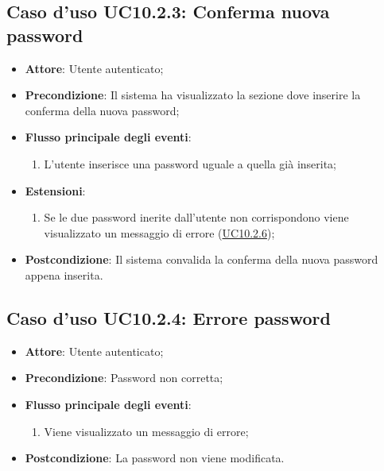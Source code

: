 \documentclass[12pt,a4paper]{article}
\begin{document}
\subsection{Caso d'uso UC10.2.3: Conferma nuova password}

\begin{itemize}

\item \textbf{Attore}: Utente autenticato; 
\item \textbf{Precondizione}: Il sistema ha visualizzato la sezione dove inserire la conferma della nuova password;

\item \textbf{Flusso principale degli eventi}:
\begin{enumerate}
	\item L'utente inserisce una password uguale a quella già inserita;
	
\end{enumerate}
\item \textbf{Estensioni}:
\begin{enumerate}
	\item Se le due password inerite dall'utente non corrispondono viene visualizzato un messaggio di errore (\hyperlink{UC10.2.6}{UC10.2.6});
	
\end{enumerate}
\item \textbf{Postcondizione}: Il sistema convalida la conferma della nuova password appena inserita.
\end{itemize}
\hypertarget{UC10.2.4}{}
\subsection{Caso d'uso UC10.2.4: Errore password}

\begin{itemize}

\item \textbf{Attore}: Utente autenticato; 
\item \textbf{Precondizione}: Password non corretta;

\item \textbf{Flusso principale degli eventi}:
\begin{enumerate}
	\item Viene visualizzato un messaggio di errore;
	
\end{enumerate}
\item \textbf{Postcondizione}: La password non viene modificata.
\end{itemize}
\hypertarget{UC10.2.5}{}
\end{document}
